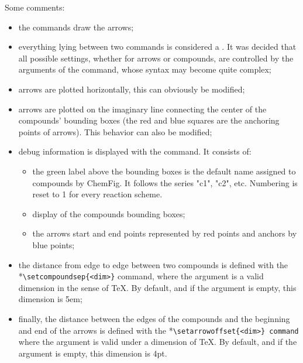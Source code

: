 \documentclass[10pt]{article}
\makeatletter
\newcommand\idx{\@ifstar{\let\print@or@not\@gobble\idx@}{\let\print@or@not\@firstofone\idx@}}
\newcommand\idx@[1]{%
	\ifcat\expandafter\noexpand\@car#1\@nil\relax%
		\expandafter\ifx\@car#1\@nil\protect
			\index{#1}%
			\print@or@not{#1}%
		\else
			\saveexpandmode\expandarg
			\StrSubstitute{\string#1}{\string @}{\@empty\protect\symbol{'100}}[\temp@]%
			\StrGobbleLeft\temp@1[\temp@]%
			\restoreexpandmode
			\expandafter\index\expandafter{\temp@ @\protect\texttt{\protect\textbackslash\temp@}}%
			\print@or@not{\texttt{\string#1}}%
		\fi
	\else
		\index{#1}%
		\print@or@not{#1}%
	\fi
}
\newcommand\CF{{\ECFAugie ChemFig}\xspace}
\makeatother
\begin{document}
Some comments:
\begin{itemize}
	\item the \idx{\arrow} commands draw the arrows;
	\item everything lying between two \idx{\arrow} commands is considered a \idx{compound}. It was decided that all possible settings, whether for arrows or compounds, are controlled by the arguments of the \idx{\arrow} command, whose syntax may become quite complex;
	\item arrows are plotted horizontally, this can obviously be modified;
	\item  arrows are plotted on the imaginary line connecting the center of the compounds' bounding boxes  (the red and blue squares are the anchoring points of arrows). This behavior can also be modified;
	\item debug information is displayed with the \idx{\schemedebug} command. It consists of:
	\begin{itemize}
		\item the green label above the bounding boxes is the default name assigned to compounds by \CF. It follows the series "c1", "c2", etc. Numbering is reset to 1 for every reaction scheme.
		\item display of the compounds bounding boxes;
		\item the arrows start and end points represented by red points and anchors by blue points;
	\end{itemize}
	\item the distance from edge to edge between two compounds is defined with the \idx*\setcompoundsep\verb-\setcompoundsep{<dim>}-\label{setcompoundsep} command, where the argument is a valid dimension in the sense of \TeX{}. By default, and if the argument is empty, this dimension is 5em;
	\item finally, the distance between the edges of the compounds and the beginning and end of the arrows is defined with the \idx*\setarrowoffset\verb-\setarrowoffset{<dim>} command- where the argument is valid under a dimension of \TeX{}. By default, and if the argument is empty, this dimension is 4pt.\label{setarrowoffset}
\end{itemize}
\end{document}
